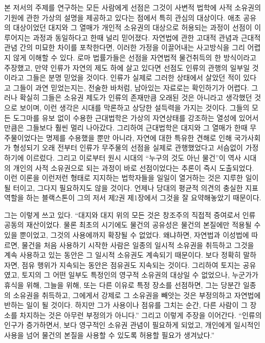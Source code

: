 본 저서의 주제를 연구하는 모든 사람에게
선점은
그것이
사변적 법학에
사적 소유권의 기원에 관한 가상의 설명을
제공하고 있다는 점에서
특히 관심의 대상이다.
애초 공유의 대상이었던 대지와 그 열매가
개인적 소유권의 대상으로 허용되는 과정이
선점이 이루어지는 과정과 동일하다고 한때 널리 믿어졌다.
자연법에 관한 고대적 관념과 근대적 관념 간의 미묘한 차이를 포착한다면,
이러한 가정을 이끌어내는 사고방식을
그리 어렵지 않게 이해할 수 있다.
로마 법률가들은 선점을 자연법적 물건취득의 한 방식이라고 주장했고,
만약 인류가 자연의 제도 하에 살고 있다면
선점도 인류의 관행의 일부일 것이라고 그들은 분명 믿었을 것이다.
인류가 실제로 그러한 상태에서 살았던 적이 있다고 그들이 과연 믿었는지는,
전술한 바처럼, 남아있는 자료로는 확인하기가 어렵다.
그러나 확실히 그들은
소유권 제도가 인류의 존재만큼 오래된 것은 아니라고 생각했던 것으로 보이며,
이런 생각은 시대를 막론하고 상당한 설득력을 가지는 것이다.
그들의 모든 도그마를 유보 없이 수용한 근대법학은
가상의 자연상태를 강조하는 열성에 있어서만큼은
그들보다 훨씬 멀리 나아갔다.
그리하여 근대법학은
대지와 그 열매가 한때 무주물이었다는 명제를
수용했을 뿐만 아니라,
자연에 대한 특유한 견해로 인해
국가사회가 형성되기 오래 전부터
인류가 무주물의 선점을 실제로 관행했었다고
서슴없이
가정하기에 이르렀다.
그리고 이로부터
원시 시대의 ``누구의 것도 아닌 물건''이
역사 시대의 개인의 사적 소유권으로 되는 과정이
바로 선점이었다는 추론이
즉시
도출되었다.
이런 이론을
이런저런 형태로
지지하는 법학자들을 일일이 열거하는 것은
지루한 일이 될 터이고,
그다지 필요하지도 않을 것이다.
언제나
당대의 평균적 의견의 충실한 지표 역할을 하는
블랙스톤이 그의 저서 제2권 제1장에서
그것을 잘 요약해놓았기 때문이다.

그는 이렇게 쓰고 있다.
``대지와 대지 위의 모든 것은 창조주의 직접적 증여로서
인류 공동의 재산이었다.
물론
최초의 시기에도
물건의 공유성은
물건의 본질에만 적용될 수 있을 뿐이었고,
그것의 사용에까지 확장될 수 없었다.
왜냐하면, 자연법과 이성법에 따르면,
물건을 처음 사용하기 시작한 사람은
일종의 일시적 소유권을 취득하고
그것을 계속 사용하고 있는 동안은 그 일시적 소유권도 계속되기 때문이다.
보다 정확히 말하자면,
점유 행위가 지속되는 동안은 점유권도 지속되는 것이다.
그리하여 토지는 공유였고,
토지의 그 어떤 일부도 특정인의 영구적 소유권의 대상일 수 없었으나,
누군가가
휴식을 위해, 그늘을 위해, 또는 다른 이유로
특정 장소를 선점하면,
그는 당분간 일종의 소유권을 취득하고,
그에게서 강제로 그 소유권을 빼앗는 것은 부정의하고
자연법에 반하는 일이 될 것이다. 하지만
그가 사용이나 점유를 그치는 순간,
다른 사람이 그 장소를 차지하는 것은 아무런 부정의가 아니다.''
그리고 이렇게 주장을 이어간다.
``인류의 인구가 증가하면서,
보다 영구적인 소유권 관념이 필요하게 되었고,
개인에게
일시적인 사용을 넘어
물건의 본질을 사용할 수 있도록
허용할 필요가 생겨났다.''

